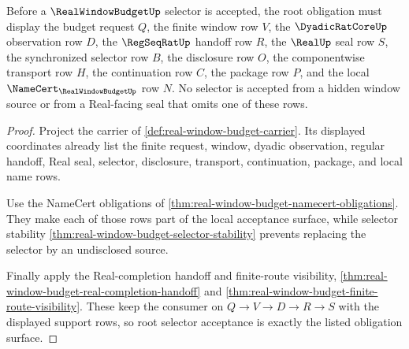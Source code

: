 \begin{theorem}
\label{thm:realwindowbudget-root-selector-obligation}
Before a $\RealWindowBudgetUp$ selector is accepted, the root obligation must
display the budget request $Q$, the finite window row $V$, the
$\DyadicRatCoreUp$ observation row $D$, the $\RegSeqRatUp$ handoff row $R$,
the $\RealUp$ seal row $S$, the synchronized selector row $B$, the disclosure
row $O$, the componentwise transport row $H$, the continuation row $C$, the
package row $P$, and the local $\NameCert_{\RealWindowBudgetUp}$ row $N$.
No selector is accepted from a hidden window source or from a Real-facing seal
that omits one of these rows.
\end{theorem}
\begin{proof}
Project the carrier of \autoref{def:real-window-budget-carrier}. Its displayed
coordinates already list the finite request, window, dyadic observation,
regular handoff, Real seal, selector, disclosure, transport, continuation,
package, and local name rows.

Use the NameCert obligations of
\autoref{thm:real-window-budget-namecert-obligations}. They make each of those
rows part of the local acceptance surface, while selector stability
\autoref{thm:real-window-budget-selector-stability} prevents replacing the
selector by an undisclosed source.

Finally apply the Real-completion handoff and finite-route visibility,
\autoref{thm:real-window-budget-real-completion-handoff} and
\autoref{thm:real-window-budget-finite-route-visibility}. These keep the
consumer on $Q \to V \to D \to R \to S$ with the displayed support rows, so
root selector acceptance is exactly the listed obligation surface.
\end{proof}

